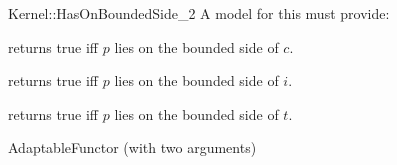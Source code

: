 \begin{ccRefFunctionObjectConcept}{Kernel::HasOnBoundedSide_2}
A model for this must provide:


{returns true iff $p$ lies on the bounded side of $c$.}

{returns true iff $p$ lies on the bounded side of $i$.}

{returns true iff $p$ lies on the bounded side of $t$.}

\ccRefines
AdaptableFunctor (with two arguments)

\ccSeeAlso
{} \\
\\
\\

\end{ccRefFunctionObjectConcept}
